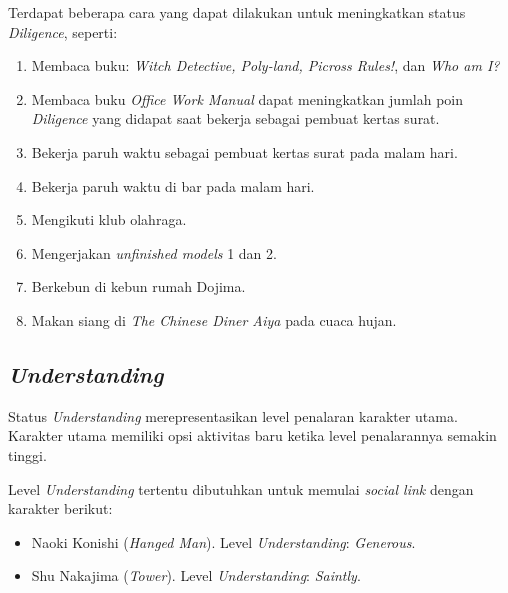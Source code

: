 Terdapat beberapa cara yang dapat dilakukan untuk meningkatkan status \textit{Diligence}, seperti:
\begin{enumerate}
    \item Membaca buku: \textit{ Witch Detective, Poly-land, Picross Rules!}, dan \textit{Who am I?}
    \item Membaca buku \textit{Office Work Manual} dapat meningkatkan jumlah poin \textit{Diligence} yang didapat saat bekerja sebagai pembuat kertas surat.
    \item Bekerja paruh waktu sebagai pembuat kertas surat pada malam hari.
    \item Bekerja paruh waktu di bar pada malam hari.
    \item Mengikuti klub olahraga.
    \item Mengerjakan \textit{unfinished models} 1 dan 2.
    \item Berkebun di kebun rumah Dojima.
    \item Makan siang di \textit{The Chinese Diner Aiya} pada cuaca hujan.
\end{enumerate}

\subsection{\textit{Understanding}}
Status \textit{Understanding} merepresentasikan level penalaran karakter utama. Karakter utama memiliki opsi aktivitas baru ketika level penalarannya semakin tinggi.

Level \textit{Understanding} tertentu dibutuhkan untuk memulai \textit{social link} dengan karakter berikut:
\begin{itemize}
    \item Naoki Konishi (\textit{Hanged Man}). Level \textit{Understanding}: \textit{Generous}.
    \item Shu Nakajima (\textit{Tower}). Level \textit{Understanding}: \textit{Saintly}.
\end{itemize}

